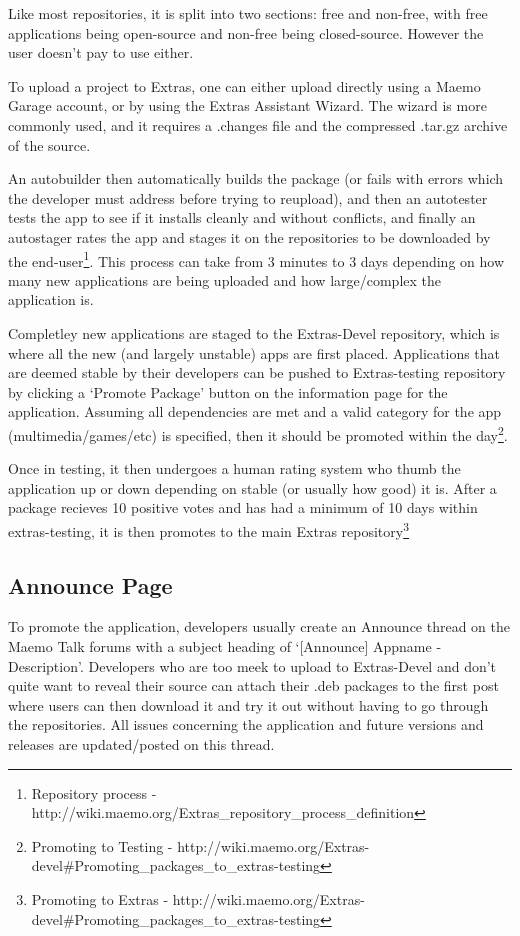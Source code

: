 Like most repositories, it is split into two sections: free and non-free, with free applications being open-source and non-free being closed-source. However the user doesn’t pay to use either.

To upload a project to Extras, one can either upload directly using a Maemo Garage account, or by using the Extras Assistant Wizard. The wizard is more commonly used, and it requires a .changes file and the compressed .tar.gz archive of the source.

An autobuilder then automatically builds the package (or fails with errors which the developer must address before trying to reupload), and then an autotester tests the app to see if it installs cleanly and without conflicts, and finally an autostager rates the app and stages it on the repositories to be downloaded by the end-user\footnote{Repository process - http://wiki.maemo.org/Extras\_repository\_process\_definition}. This process can take from 3 minutes to 3 days depending on how many new applications are being uploaded and how large/complex the application is.

Completley new applications are staged to the Extras-Devel repository, which is where all the new (and largely unstable) apps are first placed. Applications that are deemed stable by their developers can be pushed to Extras-testing repository by clicking a ‘Promote Package’ button on the information page for the application. Assuming all dependencies are met and a valid category for the app (multimedia/games/etc) is specified, then it should be promoted within the day\footnote{Promoting to Testing  - http://wiki.maemo.org/Extras-devel\#Promoting\_packages\_to\_extras-testing}. 

Once in testing, it then undergoes a human rating system who thumb the application up or down depending on stable (or usually how good) it is. After a package recieves 10 positive votes and has had a minimum of 10 days within extras-testing, it is then promotes to the main Extras repository\footnote{Promoting to Extras - http://wiki.maemo.org/Extras-devel\#Promoting\_packages\_to\_extras-testing}

\subsection{Announce Page}
To promote the application, developers usually create an Announce thread on the Maemo Talk forums with a subject heading of ‘[Announce] Appname - Description’. Developers who are too meek to upload to Extras-Devel and don’t quite want to reveal their source can attach their .deb packages to the first post where users can then download it and try it out without having to go through the repositories. All issues concerning the application and future versions and releases are updated/posted on this thread.

